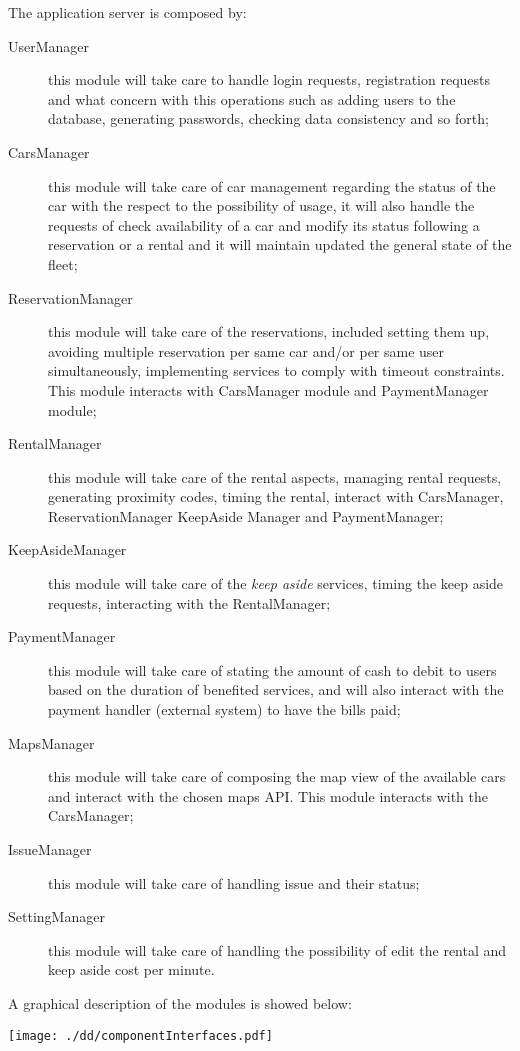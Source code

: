 \documentclass{scrreprt}
\begin{document}
The application server is composed by:
\begin{description}
\item[UserManager] this module will take care to handle login requests, registration requests and what concern with this operations such as adding users to the database, generating passwords, checking data consistency and so forth;
\item[CarsManager] this module will take care of car management regarding the status of the car with the respect to the possibility of usage, it will also handle the requests of check availability of a car and modify its status following a reservation or a rental and it will maintain updated the general state of the fleet;
\item[ReservationManager] this module will take care of the reservations, included setting them up, avoiding multiple reservation per same car and/or per same user simultaneously, implementing services to comply with timeout constraints. This module interacts with CarsManager module and PaymentManager module;
\item[RentalManager] this module will take care of the rental aspects, managing rental requests, generating proximity codes, timing the rental, interact with CarsManager, ReservationManager KeepAside Manager and PaymentManager;
\item[KeepAsideManager] this module will take care of the \emph{keep aside} services, timing the keep aside requests, interacting with the RentalManager;
\item[PaymentManager] this module will take care of stating the amount of cash to debit to users based on the duration of benefited services, and will also interact with the payment handler (external system) to have the bills paid;
\item[MapsManager] this module will take care of composing the map view of the available cars and interact with the chosen maps API. This module interacts with the CarsManager;
\item[IssueManager] this module will take care of handling issue and their status;
\item[SettingManager] this module will take care of handling the possibility of edit the rental and keep aside cost per minute.
\end{description}

A graphical description of the modules is showed below: 
\begin{center}
		\texttt{[image: ./dd/componentInterfaces.pdf]}
\end{center}
\end{document}
